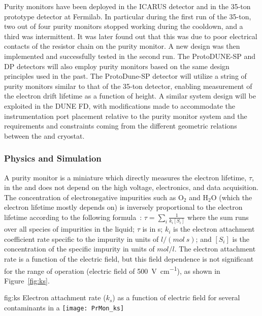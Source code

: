 Purity monitors have been deployed in the ICARUS detector and in the 35-ton prototype detector at Fermilab. In particular during the first run of the 35-ton, two out of four purity monitors stopped working during the cooldown, and a third was intermittent. It was later found out that this was due to poor electrical contacts of the resistor chain on the purity monitor. A new design was then implemented and successfully tested in the second run. 
The ProtoDUNE-SP and DP detectors will also employ purity monitors based on the same design principles used in the past. The ProtoDune-SP detector will utilize a string of purity monitors similar to that of the 35-ton detector, enabling measurement of the electron drift lifetime as a function of height.  A similar system design will be exploited in the DUNE FD, with modifications made to accommodate the instrumentation port placement relative to the purity monitor system and the requirements and constraints coming from the different geometric relations between the  and cryostat. 

\subsubsection{Physics and Simulation}
A purity monitor is a miniature  which directly measures the electron lifetime, $\tau$, in the  and does not depend on the   high voltage, electronics, and data acquisition. The concentration of electronegative impurities such as $\text{O}_2$ and $\text{H}_2\text{O}$ (which the electron lifetime mostly depends on) is inversely proportional to the electron lifetime according to the following formula~\cite{doi:10.1021/j100564a006}:
%
\(\tau = \sum_i \frac{1}{k_i [S_i]}\)
%
where the sum runs over all species of impurities in the liquid; $\tau$ is in s; $k_i$ is the electron attachment coefficient rate specific to the impurity in units of $l/(mol~s)$; and $[S_i]$ is the concentration of the specific impurity in units of $mol/l$. The electron attachment rate is a function of the electric field, but this field dependence is not significant for the range of  operation (electric field of \SI{500}{\volt\per\centi\meter}), as shown in Figure~\ref{fig:ks}. 

\begin{dunefigure}{fig:ks}
  {Electron attachment rate ($k_s$) as a function of electric field for several contaminants in a  \cite{docdb-4482}}
  \texttt{[image: PrMon\_ks]}%
\end{dunefigure}

